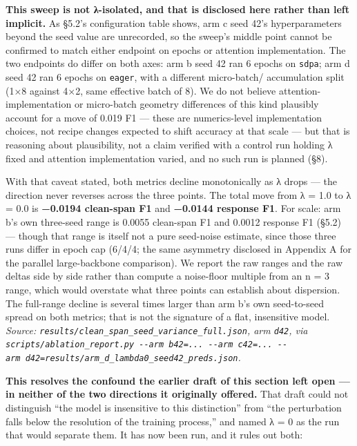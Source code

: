 \documentclass[11pt]{article}
\begin{document}
\textbf{This sweep is not λ-isolated, and that is disclosed here rather than left implicit.} As
§5.2's configuration table shows, arm c seed 42's hyperparameters beyond the seed value are
unrecorded, so the sweep's middle point cannot be confirmed to match either endpoint on
epochs or attention implementation. The two endpoints do differ on both axes: arm b seed 42
ran 6 epochs on \texttt{sdpa}; arm d seed 42 ran 6 epochs on \texttt{eager}, with a different micro-batch/
accumulation split (1×8 against 4×2, same effective batch of 8). We do not believe
attention-implementation or micro-batch geometry differences of this kind plausibly account
for a move of 0.019 F1 --- these are numerics-level implementation choices, not recipe changes
expected to shift accuracy at that scale --- but that is reasoning about plausibility, not a
claim verified with a control run holding λ fixed and attention implementation varied, and no
such run is planned (§8).

\begin{sloppypar}
With that caveat stated, both metrics decline monotonically as λ drops --- the direction never
reverses across the three points. The total move from λ = 1.0 to λ = 0.0 is \textbf{−0.0194
clean-span F1} and \textbf{−0.0144 response F1}. For scale: arm b's own three-seed range is 0.0055
clean-span F1 and 0.0012 response F1 (§5.2) --- though that range is itself not a pure
seed-noise estimate, since those three runs differ in epoch cap (6/4/4; the same asymmetry
disclosed in Appendix A for the parallel large-backbone comparison). We report the raw ranges
and the raw deltas side by side rather than compute a noise-floor multiple from an n = 3
range, which would overstate what three points can establish about dispersion. The full-range
decline is several times larger than arm b's own seed-to-seed spread on both metrics; that is
not the signature of a flat, insensitive model. \emph{Source:
\texttt{results/clean\_span\_seed\_variance\_full.json}, arm \texttt{d42}, via \texttt{scripts/ablation\_report.py\ -\/-arm\ b42=...\ -\/-arm\ c42=...\ -\/-arm\ d42=results/arm\_d\_lambda0\_seed42\_preds.json}.}
\end{sloppypar}

\textbf{This resolves the confound the earlier draft of this section left open --- in neither of the
two directions it originally offered.} That draft could not distinguish ``the model is
insensitive to this distinction'' from ``the perturbation falls below the resolution of the
training process,'' and named λ = 0 as the run that would separate them. It has now been run,
and it rules out both:
\end{document}
